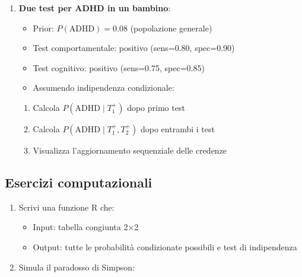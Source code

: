 \documentclass[
  italian,
  letterpaper,
  a4paper,
  11pt,
  open=any]{scrbook}
\providecommand{\tightlist}{%
  \setlength{\itemsep}{0pt}\setlength{\parskip}{0pt}}
\theoremstyle{plain}
\theoremstyle{definition}
\theoremstyle{definition}
\theoremstyle{remark}
\begin{document}
\begin{tcolorbox}
\begin{enumerate}
  \begin{enumerate}
  \def\labelenumii{\alph{enumii}.}
  \tightlist
  \item
    Calcola \(P(\text{PTSD} \cap \text{Depressione})\)
  \item
    Calcola \(P(\text{PTSD} \mid \text{Depressione})\)
  \item
    Sono indipendenti? Commenta il risultato clinicamente
  \end{enumerate}
\item
  \textbf{Due test per ADHD in un bambino}:

  \begin{itemize}
  \tightlist
  \item
    Prior: \(P(\text{ADHD}) = 0.08\) (popolazione generale)
  \item
    Test comportamentale: positivo (sens=0.80, spec=0.90)
  \item
    Test cognitivo: positivo (sens=0.75, spec=0.85)
  \item
    Assumendo indipendenza condizionale:
  \end{itemize}

  \begin{enumerate}
  \def\labelenumii{\alph{enumii}.}
  \tightlist
  \item
    Calcola \(P(\text{ADHD} \mid T_1^+)\) dopo primo test
  \item
    Calcola \(P(\text{ADHD} \mid T_1^+, T_2^+)\) dopo entrambi i test
  \item
    Visualizza l'aggiornamento sequenziale delle credenze
  \end{enumerate}
\end{enumerate}

\subsection*{Esercizi computazionali}\label{esercizi-computazionali-1}

\begin{enumerate}
\def\labelenumi{\arabic{enumi}.}
\setcounter{enumi}{22}
\tightlist
\item
  Scrivi una funzione R che:

  \begin{itemize}
  \tightlist
  \item
    Input: tabella congiunta 2×2
  \item
    Output: tutte le probabilità condizionate possibili e test di
    indipendenza
  \end{itemize}
\item
  Simula il paradosso di Simpson:


\end{enumerate}
\end{tcolorbox}
\end{document}
